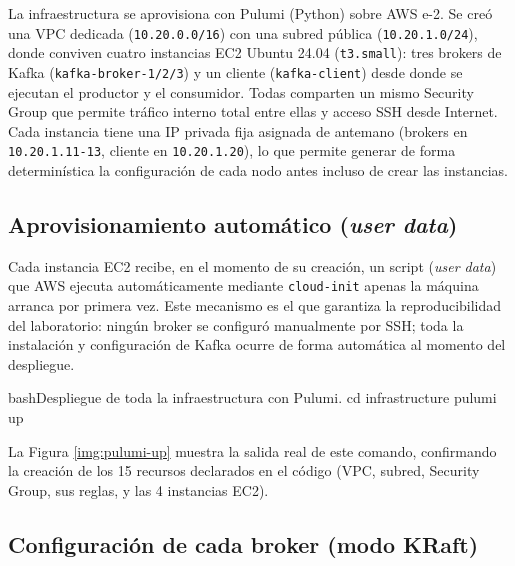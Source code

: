 		La infraestructura se aprovisiona con Pulumi (Python) sobre AWS e-2. Se creó una VPC dedicada (\texttt{10.20.0.0/16}) con una subred pública (\texttt{10.20.1.0/24}), donde conviven cuatro instancias EC2 Ubuntu 24.04 (\texttt{t3.small}): tres brokers de Kafka (\texttt{kafka-broker-1/2/3}) y un cliente (\texttt{kafka-client}) desde donde se ejecutan el productor y el consumidor. Todas comparten un mismo Security Group que permite tráfico interno total entre ellas y acceso SSH desde Internet. Cada instancia tiene una IP privada fija asignada de antemano (brokers en \texttt{10.20.1.11-13}, cliente en \texttt{10.20.1.20}), lo que permite generar de forma determinística la configuración de cada nodo antes incluso de crear las instancias.

	\subsection{Aprovisionamiento automático (\textit{user data})}

		Cada instancia EC2 recibe, en el momento de su creación, un script (\textit{user data}) que AWS ejecuta automáticamente mediante \texttt{cloud-init} apenas la máquina arranca por primera vez. Este mecanismo es el que garantiza la reproducibilidad del laboratorio: ningún broker se configuró manualmente por SSH; toda la instalación y configuración de Kafka ocurre de forma automática al momento del despliegue.

		\begin{sourcecode}[\label{codigo-pulumi-up}]{bash}{Despliegue de toda la infraestructura con Pulumi.}
cd infrastructure
pulumi up
		\end{sourcecode}

		La Figura \ref{img:pulumi-up} muestra la salida real de este comando, confirmando la creación de los 15 recursos declarados en el código (VPC, subred, Security Group, sus reglas, y las 4 instancias EC2).


	\subsection{Configuración de cada broker (modo KRaft)}

